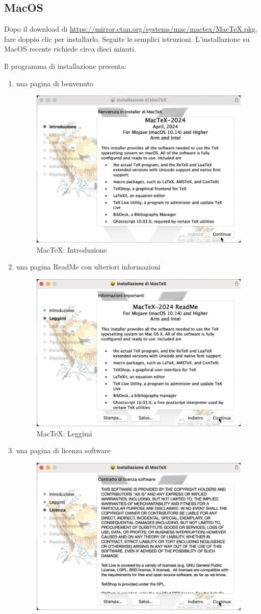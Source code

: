 \documentclass[envcountsame,envcountchap]{svmono}
\begin{document}
\label{esempio_citazione}
\subsection{MacOS \citep{installMacTeX}}
Dopo il download di \url{https://mirror.ctan.org/systems/mac/mactex/MacTeX.pkg}, 
fare doppio clic per installarlo. Seguite le semplici istruzioni. 
L'installazione su MacOS recente richiede circa dieci minuti.

Il programma di installazione presenta:
\label{esempio_elenco_numerato}
\begin{enumerate}
    \item una pagina di benvenuto
        \begin{figure}[H]
            \centering
            \includegraphics[width=0.5\linewidth]{images/texlive/mac/1_introduzione.png}
            \caption{MacTeX: Introduzione}
            \label{mactex_introduzione}
        \end{figure}
    \item una pagina ReadMe con ulteriori informazioni
        \begin{figure}[H]
            \centering
            \includegraphics[width=0.5\linewidth]{images/texlive/mac/2_leggimi.png}
            \caption{MacTeX: Leggimi}
            \label{mactex_readme}
        \end{figure}
    \item una pagina di licenza software
        \begin{figure}[H]
            \centering
            \includegraphics[width=0.5\linewidth]{images/texlive/mac/3_licenza.png}

\end{figure}
\end{enumerate}
\end{document}
